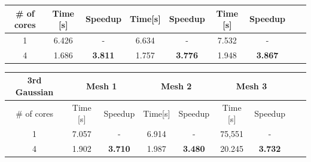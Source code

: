 \documentclass[8pt]{beamer}
\begin{document}
\begin{frame}
\begin{footnotesize}
\begin{center}
\begin{tabular}{|c|c|c|c|c|c|c|c|c|}
    \hline
    \# of cores & Time [s] & Speedup & Time[s] & Speedup & Time [s] & Speedup \\
    \hline
    1 & 6.426 & - & 6.634 & - & 7.532 & - \\
    4 & 1.686 & \textbf{3.811} & 1.757 & \textbf{3.776} & 1.948 & \textbf{3.867} \\
    \hline
\end{tabular}
\end{center}
\begin{center}
\begin{tabular}{|c|c|c|c|c|c|c|c|c|} 
   \hline
    \textbf{3rd Gaussian}& \multicolumn{2}{|c|}{Mesh 1} & \multicolumn{2}{|c|}{Mesh 2} & \multicolumn{2}{|c|}{Mesh 3}\\
    \hline
    \# of cores & Time [s] & Speedup & Time[s] & Speedup & Time [s] & Speedup \\
    \hline
    1 & 7.057 & - & 6.914 & - & 75,551 & - \\
    4 & 1.902 & \textbf{3.710} & 1.987 & \textbf{3.480} & 20.245 & \textbf{3.732} \\
    \hline
\end{tabular}
\end{center}
\end{footnotesize}
\end{frame}
\end{document}
